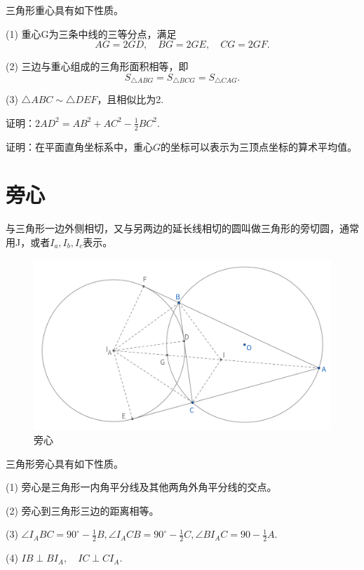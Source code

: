 \begin{proposition}[重心性质]
    三角形重心具有如下性质。
    
    (1) 重心G为三条中线的三等分点，满足
    $$AG=2GD,\quad 
    BG=2GE,\quad
    CG=2GF.$$

    (2) 三边与重心组成的三角形面积相等，即
    $$S_{\triangle ABG} = S_{\triangle BCG}=S_{\triangle CAG}.$$

    (3) $\triangle ABC \sim \triangle DEF$，且相似比为2.
\end{proposition}
\begin{exercise}
    证明：$2AD^2=AB^2+AC^2-\frac{1}{2}BC^2.$
\end{exercise}
\begin{exercise}
    证明：在平面直角坐标系中，重心$G$的坐标可以表示为三顶点坐标的算术平均值。
\end{exercise}


\newpage
\section{旁心}
\begin{definition}[旁心]
    与三角形一边外侧相切，又与另两边的延长线相切的圆叫做三角形的旁切圆，通常用J，或者$I_a,I_b,I_c$表示。    
\end{definition}

\begin{figure}[H]
    \centering
    \includegraphics[width=0.6\linewidth]{figures/三角形五心/旁心.png}
    \caption{旁心}
\end{figure}


\begin{proposition}[旁心性质]
    三角形旁心具有如下性质。
    
    (1) 旁心是三角形一内角平分线及其他两角外角平分线的交点。

    (2) 旁心到三角形三边的距离相等。

    (3) $\angle I_ABC = 90^\circ - \frac{1}{2}B, \angle I_ACB = 90^\circ - \frac{1}{2}C, \angle BI_AC=90 - \frac{1}{2}A.$

    (4) $IB\perp BI_A, \quad IC\perp CI_A.$
\end{proposition}

